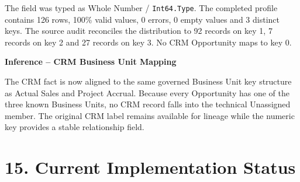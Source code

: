 \documentclass[11pt,a4paper]{article}
\begin{document}
The field was typed as Whole Number / \texttt{Int64.Type}. The completed
profile contains 126 rows, 100\% valid values, 0 errors, 0 empty values and
3 distinct keys. The source audit reconciles the distribution to 92 records on
key 1, 7 records on key 2 and 27 records on key 3. No CRM Opportunity maps to
key 0.

\begin{inferencebox}

\textbf{Inference -- CRM Business Unit Mapping}

The CRM fact is now aligned to the same governed Business Unit key structure as
Actual Sales and Project Accrual. Because every Opportunity has one of the three
known Business Units, no CRM record falls into the technical Unassigned member.
The original CRM label remains available for lineage while the numeric key
provides a stable relationship field.

\end{inferencebox}


\section{15. Current Implementation Status}
\end{document}
